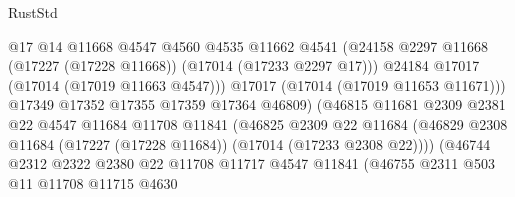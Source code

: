 \begin{lexlean}{RustStd}
\begin{coremodule}
{\begin{coremodule}
{{{{{{{{{{{{{{{{{{{{{{{{{{{{{{{{{{{{{{{{{{{{{{{{{{{{{{{                                      @17
                                      @14
                                      @11668
                                      @4547
                                      @4560
                                      @4535
                                      @11662
                                      @4541
                                      (@24158
                                        @2297
                                        @11668
                                        (@17227 (@17228 @11668))
                                        (@17014 (@17233 @2297 @17)))
                                      @24184
                                      @17017
                                      (@17014 (@17019 @11663 @4547)))
                                    @17017
                                    (@17014 (@17019 @11653 @11671)))
                                  @17349
                                  @17352
                                  @17355
                                  @17359
                                  @17364
                                  @46809)
                                (@46815
                                  @11681
                                  @2309
                                  @2381
                                  @22
                                  @4547
                                  @11684
                                  @11708
                                  @11841
                                  (@46825
                                    @2309
                                    @22
                                    @11684
                                    (@46829
                                      @2308
                                      @11684
                                      (@17227 (@17228 @11684))
                                      (@17014 (@17233 @2308 @22))))
                                  (@46744
                                    @2312
                                    @2322
                                    @2380
                                    @22
                                    @11708
                                    @11717
                                    @4547
                                    @11841
                                    (@46755
                                      @2311
                                      @503
                                      @11
                                      @11708
                                      @11715
                                      @4630
}}}}}}}}}}}}}}}}}}}}}}}}}}}}}}}}}}}}}}}}}}}}}}}}}}}}}}}
\end{coremodule}}
\end{coremodule}
\end{lexlean}
